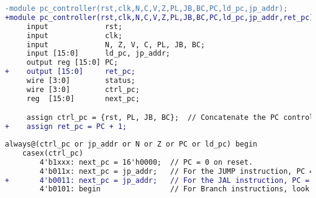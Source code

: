 \begin{lstlisting}[language=diff, firstnumber=24]
-module pc_controller(rst,clk,N,C,V,Z,PL,JB,BC,PC,ld_pc,jp_addr);
+module pc_controller(rst,clk,N,C,V,Z,PL,JB,BC,PC,ld_pc,jp_addr,ret_pc);
     input             rst;
     input             clk;
     input             N, Z, V, C, PL, JB, BC;
     input [15:0]      ld_pc, jp_addr;
     output reg [15:0] PC;
+    output [15:0]     ret_pc;
     wire [3:0]        status;
     wire [3:0]        ctrl_pc;
     reg  [15:0]       next_pc;

     assign ctrl_pc = {rst, PL, JB, BC};  // Concatenate the PC control bits
+    assign ret_pc = PC + 1;
\end{lstlisting}

\begin{lstlisting}[language=diff, firstnumber=47]
always@(ctrl_pc or jp_addr or N or Z or PC or ld_pc) begin
    casex(ctrl_pc)
        4'b1xxx: next_pc = 16'h0000;  // PC = 0 on reset.
        4'b011x: next_pc = jp_addr;   // For the JUMP instruction, PC = jp_addr.
+       4'b0011: next_pc = jp_addr;   // For the JAL instruction, PC = jp_addr. ret_pc = PC + 1
        4'b0101: begin                // For Branch instructions, look at the status bits.
\end{lstlisting}
